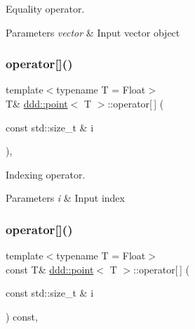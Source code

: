 Equality operator. 


\begin{DoxyParams}{Parameters}
{\em vector} & Input vector object \\
\hline
\end{DoxyParams}
\mbox{\label{classddd_1_1point_aabf1454e1f0496fb70c1e62852aa2595}} 
\subsubsection{\texorpdfstring{operator[]()}{operator[]()}\hspace{0.1cm}{\footnotesize\ttfamily [1/2]}}
{\footnotesize\ttfamily template$<$typename T = Float$>$ \\
T\& \hyperlink{classddd_1_1point}{ddd\+::point}$<$ T $>$\+::operator\mbox{[}$\,$\mbox{]} (\begin{DoxyParamCaption}\item[{const std\+::size\+\_\+t \&}]{i }\end{DoxyParamCaption})\hspace{0.3cm}{\ttfamily [inline]}, {\ttfamily [inherited]}}



Indexing operator. 


\begin{DoxyParams}{Parameters}
{\em i} & Input index \\
\hline
\end{DoxyParams}
\mbox{\label{classddd_1_1point_a320e2bfca11915c5ebb9ed0581a3cab1}} 
\subsubsection{\texorpdfstring{operator[]()}{operator[]()}\hspace{0.1cm}{\footnotesize\ttfamily [2/2]}}
{\footnotesize\ttfamily template$<$typename T = Float$>$ \\
const T\& \hyperlink{classddd_1_1point}{ddd\+::point}$<$ T $>$\+::operator\mbox{[}$\,$\mbox{]} (\begin{DoxyParamCaption}\item[{const std\+::size\+\_\+t \&}]{i }\end{DoxyParamCaption}) const\hspace{0.3cm}{\ttfamily [inline]}, {\ttfamily [inherited]}}



